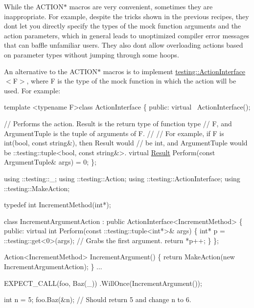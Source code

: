While the {\ttfamily A\+C\+T\+I\+O\+N$\ast$} macros are very convenient, sometimes they are inappropriate. For example, despite the tricks shown in the previous recipes, they don\textquotesingle{}t let you directly specify the types of the mock function arguments and the action parameters, which in general leads to unoptimized compiler error messages that can baffle unfamiliar users. They also don\textquotesingle{}t allow overloading actions based on parameter types without jumping through some hoops.

An alternative to the {\ttfamily A\+C\+T\+I\+O\+N$\ast$} macros is to implement {\ttfamily \hyperlink{classtesting_1_1ActionInterface}{testing\+::\+Action\+Interface}$<$F$>$}, where {\ttfamily F} is the type of the mock function in which the action will be used. For example\+:


\begin{DoxyCode}
\textcolor{keyword}{template} <\textcolor{keyword}{typename} F>\textcolor{keyword}{class }ActionInterface \{
 \textcolor{keyword}{public}:
  \textcolor{keyword}{virtual} ~ActionInterface();

  \textcolor{comment}{// Performs the action.  Result is the return type of function type}
  \textcolor{comment}{// F, and ArgumentTuple is the tuple of arguments of F.}
  \textcolor{comment}{//}
  \textcolor{comment}{// For example, if F is int(bool, const string&), then Result would}
  \textcolor{comment}{// be int, and ArgumentTuple would be ::testing::tuple<bool, const string&>.}
  \textcolor{keyword}{virtual} \hyperlink{classResult}{Result} Perform(\textcolor{keyword}{const} ArgumentTuple& args) = 0;
\};

using ::testing::\_;
using ::testing::Action;
using ::testing::ActionInterface;
using ::testing::MakeAction;

\textcolor{keyword}{typedef} \textcolor{keywordtype}{int} IncrementMethod(\textcolor{keywordtype}{int}*);

\textcolor{keyword}{class }IncrementArgumentAction : \textcolor{keyword}{public} ActionInterface<IncrementMethod> \{
 \textcolor{keyword}{public}:
  \textcolor{keyword}{virtual} \textcolor{keywordtype}{int} Perform(const ::testing::tuple<int*>& args) \{
    \textcolor{keywordtype}{int}* p = ::testing::get<0>(args);  \textcolor{comment}{// Grabs the first argument.}
    \textcolor{keywordflow}{return} *p++;
  \}
\};

Action<IncrementMethod> IncrementArgument() \{
  \textcolor{keywordflow}{return} MakeAction(\textcolor{keyword}{new} IncrementArgumentAction);
\}
...

  EXPECT\_CALL(foo, Baz(\_))
      .WillOnce(IncrementArgument());

  \textcolor{keywordtype}{int} n = 5;
  foo.Baz(&n);  \textcolor{comment}{// Should return 5 and change n to 6.}
\end{DoxyCode}


